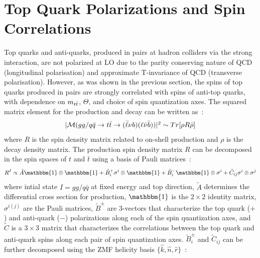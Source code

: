 \section{Top Quark Polarizations and \ttbar Spin Correlations}
Top quarks and anti-quarks, produced in \ttbar pairs at hadron colliders via the strong interaction, are not polarized at LO due to the parity conserving nature of QCD (longitudinal polarisation) and approximate T-invariance of QCD (transverse polarisation).
However, as was shown in the previous section, the spins of top quarks produced in \ttbar pairs are strongly correlated with spins of anti-top quarks, with dependence on $m_{t\bar{t}}$, $\Theta$, and choice of spin quantization axes. 
The squared matrix element for the \ttbar production and decay can be written as~\cite{Bernreuther}:
\begin{align}
\begin{array}{c}
\vert\mathcal{M}(gg/q\bar{q} \to t\bar{t} \to (\bar{\ell} \nu b)(\ell \bar{\nu} \bar{b}) )\vert^2 \sim Tr[\rho R \bar{\rho}]
\end{array}
\label{ttbar_squared_matrix_element}
\end{align}
where $R$ is the spin density matrix related to on-shell \ttbar production and $\rho$ is the decay density matrix.
The production spin density matrix $R$ can be decomposed in the spin spaces of $t$ and $\bar{t}$ using a basis of Pauli matrices~\cite{Bernreuther}:
\begin{align}
R^I \propto \tilde{A} \mathbbm{1} \otimes  \mathbbm{1} + \tilde{B}_i^+ \sigma^i \otimes \mathbbm{1} + \tilde{B}_i^- \mathbbm{1} \otimes \sigma^i + \tilde{C}_{ij} \sigma^i \otimes \sigma^j
\label{spin_density_matrix_decomposition}
\end{align}
where intial state $I = gg / q\bar{q}$ at fixed energy and top direction, $\tilde{A}$ determines the differential cross section for \ttbar production, $\mathbbm{1}$ is the $2\times2$ identity matrix, $\sigma^{i(j)}$ are the Pauli matrices, $\tilde{B}^\pm$ are 3-vectors that characterize the top quark ($+$) and anti-quark ($-$) polarizations along each of the spin quantization axes, and $\tilde{C}$ is a $3\times3$ matrix that characterizes the correlations between the top quark and anti-quark spins along each pair of spin quantization axes.
$\tilde{B}_i^\pm$ and $ \tilde{C}_{ij} $ can be further decomposed using the \ttbar ZMF helicity basis $\{\hat{k},\hat{n},\hat{r}\}$~\cite{Bernreuther}:
